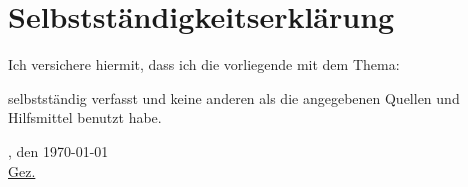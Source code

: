 \chapter*{Selbstständigkeitserklärung}

Ich versichere hiermit, dass ich die vorliegende \arbeit{} mit dem Thema:
\begin{quote}
	\textit{\titel}
\end{quote}
selbstständig verfasst und keine anderen als die angegebenen Quellen und Hilfsmittel benutzt habe.

\vspace{0.25cm}


\vspace{1cm}

\verfassungsort, den \today \\[0.5cm]
	{\underline{Gez. \autor}}
	{\makebox[6cm]{\hrulefill}}\\ 
\autorReverse
